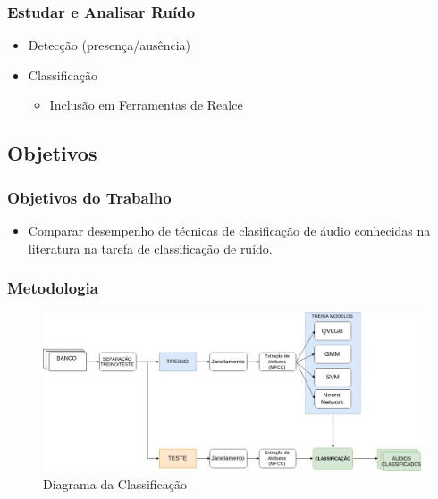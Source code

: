 \documentclass{beamer}
\begin{document}
\begin{frame}
	\justifying
  	\frametitle{Estudar e Analisar Ruído}
  	\begin{itemize}
  		 \setlength\itemsep{1em}
  		\item Detecção (presença/ausência)
        \item Classificação
        \begin{itemize}
        \item Inclusão em Ferramentas de Realce
        \end{itemize}
  	\end{itemize}
\end{frame}

\subsection{Objetivos}

\begin{frame}
	\justifying
  	\frametitle{Objetivos do Trabalho}
  	
  	\begin{itemize}
  		\setlength\itemsep{1em}
  		\item Comparar desempenho de técnicas de clasificação de áudio conhecidas na literatura na tarefa de classificação de ruído.
        
 	\end{itemize}
  		
\end{frame}

\begin{frame}
	\justifying
  	\frametitle{Metodologia}
  	
  	\begin{figure}[ht]
    	\centering
		\includegraphics[width=\textwidth]{diagrama_artigo_maior.jpg}
		\caption{Diagrama da Classificação}
		\label{fig:diagclass}
	\end{figure}

  		
\end{frame}
\end{document}
